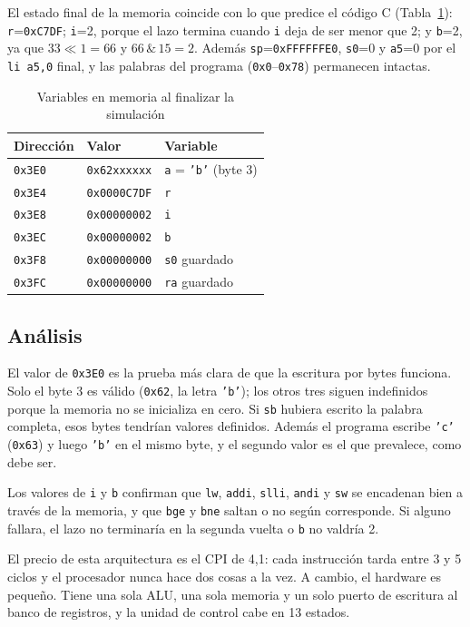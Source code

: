 \documentclass[conference]{IEEEtran}
\newcommand{\cod}[1]{\texttt{\small #1}}
\begin{document}
El estado final de la memoria coincide con lo que predice el código C (Tabla~\ref{tab:mem}): \cod{r}=\cod{0xC7DF}; \cod{i}=2, porque el lazo termina cuando \cod{i} deja de ser menor que 2; y \cod{b}=2, ya que $33\ll1=66$ y $66\,\&\,15=2$. Además \cod{sp}=\cod{0xFFFFFFE0}, \cod{s0}=0 y \cod{a5}=0 por el \cod{li a5,0} final, y las palabras del programa (\cod{0x0}--\cod{0x78}) permanecen intactas.

\begin{table}[t]
\caption{Variables en memoria al finalizar la simulación}\label{tab:mem}
\centering\footnotesize
\begin{tabular}{@{}lll@{}}\toprule
Dirección & Valor & Variable\\\midrule
\cod{0x3E0} & \cod{0x62xxxxxx} & \cod{a} = \texttt{'b'} (byte 3)\\
\cod{0x3E4} & \cod{0x0000C7DF} & \cod{r}\\
\cod{0x3E8} & \cod{0x00000002} & \cod{i}\\
\cod{0x3EC} & \cod{0x00000002} & \cod{b}\\
\cod{0x3F8} & \cod{0x00000000} & \cod{s0} guardado\\
\cod{0x3FC} & \cod{0x00000000} & \cod{ra} guardado\\\bottomrule
\end{tabular}
\end{table}

\subsection{Análisis}
El valor de \cod{0x3E0} es la prueba más clara de que la escritura por bytes funciona. Solo el byte 3 es válido (\cod{0x62}, la letra \texttt{'b'}); los otros tres siguen indefinidos porque la memoria no se inicializa en cero. Si \cod{sb} hubiera escrito la palabra completa, esos bytes tendrían valores definidos. Además el programa escribe \texttt{'c'} (\cod{0x63}) y luego \texttt{'b'} en el mismo byte, y el segundo valor es el que prevalece, como debe ser.

Los valores de \cod{i} y \cod{b} confirman que \cod{lw}, \cod{addi}, \cod{slli}, \cod{andi} y \cod{sw} se encadenan bien a través de la memoria, y que \cod{bge} y \cod{bne} saltan o no según corresponde. Si alguno fallara, el lazo no terminaría en la segunda vuelta o \cod{b} no valdría 2.

El precio de esta arquitectura es el CPI de 4,1: cada instrucción tarda entre 3 y 5 ciclos y el procesador nunca hace dos cosas a la vez. A cambio, el hardware es pequeño. Tiene una sola ALU, una sola memoria y un solo puerto de escritura al banco de registros, y la unidad de control cabe en 13 estados.
\end{document}
